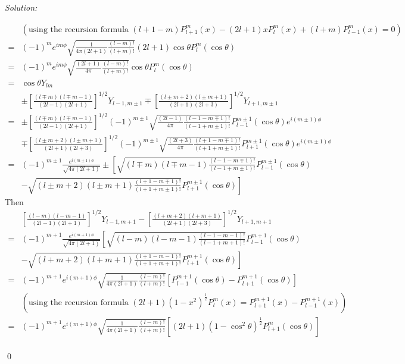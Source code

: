 \documentclass[12pt,a4paper]{article}
\newenvironment{sol}
    {\emph{Solution:}
    }
    {
    \qed
    }
\begin{document}
\begin{sol}
\begin{align}
\nonumber&(\text{using the recursion formula }(l+1-m)P_{l+1}^m(x)-(2l+1)xP_l^m(x)+(l+m)P_{l-1}^m(x)=0)\\
\nonumber=&(-1)^me^{im\phi}\sqrt{\frac{1}{4\pi(2l+1)}\frac{(l-m)!}{(l+m)!}}(2l+1)\cos\theta P_l^m(\cos\theta)\\
\nonumber=&(-1)^me^{im\phi}\sqrt{\frac{(2l+1)}{4\pi}\frac{(l-m)!}{(l+m)!}}\cos\theta P_l^m(\cos\theta)\\
=&\cos\theta Y_{lm}
\end{align}
\begin{align}
\nonumber&\pm\left[\frac{(l\mp m)(l\mp m-1)}{(2l-1)(2l+1)}\right]^{1/2}Y_{l-1,m\pm1}\mp\left[\frac{(l\pm m+2)(l\pm m+1)}{(2l+1)(2l+3)}\right]^{1/2}Y_{l+1,m\pm1}\\
\nonumber=&\pm\left[\frac{(l\mp m)(l\mp m-1)}{(2l-1)(2l+1)}\right]^{1/2}(-1)^{m\pm1}\sqrt{\frac{(2l-1)}{4\pi}\frac{(l-1-m\mp1)!}{(l-1+m\pm1)!}}P_{l-1}^{m\pm1}(\cos\theta)e^{i(m\pm1)\phi}\\
\nonumber&\mp\left[\frac{(l\pm m+2)(l\pm m+1)}{(2l+1)(2l+3)}\right]^{1/2}(-1)^{m\pm1}\sqrt{\frac{(2l+3)}{4\pi}\frac{(l+1-m\mp1)!}{(l+1+m\pm1)!}}P_{l+1}^{m\pm1}(\cos\theta)e^{i(m\pm1)\phi}\\
\nonumber=&(-1)^{m\pm1}\frac{e^{i(m\pm1)\phi}}{\sqrt{4\pi(2l+1)}}\pm\left[\sqrt{(l\mp m)(l\mp m-1)\frac{(l-1-m\mp1)!}{(l-1+m\pm1)!}}P_{l-1}^{m\pm1}(\cos\theta)\right.\\
&\left.-\sqrt{(l\pm m+2)(l\pm m+1)\frac{(l+1-m\mp1)!}{(l+1+m\pm1)!}}P_{l+1}^{m\pm1}(\cos\theta)\right]
\end{align}
Then
\begin{align}
\nonumber&\left[\frac{(l-m)(l-m-1)}{(2l-1)(2l+1)}\right]^{1/2}Y_{l-1,m+1}-\left[\frac{(l+m+2)(l+m+1)}{(2l+1)(2l+3)}\right]^{1/2}Y_{l+1,m+1}\\
\nonumber=&(-1)^{m+1}\frac{e^{i(m+1)\phi}}{\sqrt{4\pi(2l+1)}}\left[\sqrt{(l-m)(l-m-1)\frac{(l-1-m-1)!}{(l-1+m+1)!}}P_{l-1}^{m+1}(\cos\theta)\right.\\
\nonumber&\left.-\sqrt{(l+m+2)(l+m+1)\frac{(l+1-m-1)!}{(l+1+m+1)!}}P_{l+1}^{m+1}(\cos\theta)\right]\\
\nonumber=&(-1)^{m+1}e^{i(m+1)\phi}\sqrt{\frac{1}{4\pi(2l+1)}\frac{(l-m)!}{(l+m)!}}\left[P_{l-1}^{m+1}(\cos\theta)-P_{l+1}^{m+1}(\cos\theta)\right]\\
\nonumber&(\text{using the recursion formula }(2l+1)(1-x^2)^{\frac{1}{2}}P_l^m(x)=P_{l+1}^{m+1}(x)-P_{l-1}^{m+1}(x))\\
\nonumber=&(-1)^{m+1}e^{i(m+1)\phi}\sqrt{\frac{1}{4\pi(2l+1)}\frac{(l-m)!}{(l+m)!}}\left[(2l+1)(1-\cos^2\theta)^{\frac{1}{2}}P_{l+1}^m(\cos\theta)\right]\\

\end{align}
\end{sol}
\end{document}

